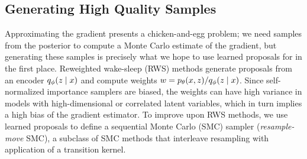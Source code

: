 \documentclass[anonymous=false, %
               format=acmsmall, %
               review=true, %
               screen=true, %
               nonacm=true]{acmart}
\theoremstyle{definition}
\begin{document}
\subsection{Generating High Quality Samples}
Approximating the gradient presents a chicken-and-egg problem; we need samples from the posterior to compute a Monte Carlo estimate of the gradient, but generating these samples is precisely what we hope to use learned proposals for in the first place. 
Reweighted wake-sleep (RWS) methods \cite{le2019revisiting} generate proposals from an encoder $q_\phi(z \mid x)$ and compute weights $w = p_\theta(x, z) / q_\phi(z \mid x)$. Since self-normalized importance samplers are biased, the weights can have high variance in models with high-dimensional or correlated latent variables, which in turn implies a high bias of the gradient estimator. To improve upon RWS methods, we use learned proposals to define a sequential Monte Carlo (SMC) sampler \cite{delmoral2006sequential} (\emph{resample-move} SMC), a subclass of SMC methods \cite{doucet2001sequential} that interleave resampling with application of a transition kernel.

\end{document}

